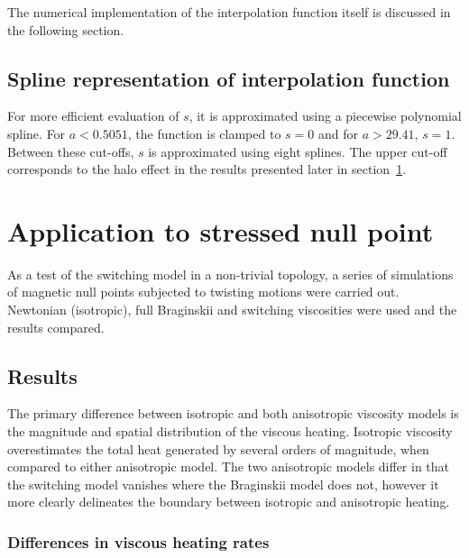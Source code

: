 The numerical implementation of the interpolation function itself is discussed in the following section.

\subsection{Spline representation of interpolation function}

For more efficient evaluation of $s$, it is approximated using a piecewise polynomial spline. For $a < 0.5051$, the function is clamped to $s=0$ and for $a > 29.41$, $s=1$. Between these cut-offs, $s$ is approximated using eight splines. The upper cut-off corresponds to the halo effect in the results presented later in section~\ref{sec:slow_null_point}.



\section{Application to stressed null point}

\label{sec:slow_null_point}

As a test of the switching model in a non-trivial topology, a series of simulations of magnetic null points subjected to twisting motions were carried out. Newtonian (isotropic), full Braginskii and switching viscosities were used and the results compared.


\subsection{Results}


\label{sec:slow_null_results}

The primary difference between isotropic and both anisotropic viscosity models is the magnitude and spatial distribution of the viscous heating. Isotropic viscosity overestimates the total heat generated by several orders of magnitude, when compared to either anisotropic model. The two anisotropic models differ in that the switching model vanishes where the Braginskii model does not, however it more clearly delineates the boundary between isotropic and anisotropic heating.

\subsubsection{Differences in viscous heating rates}

